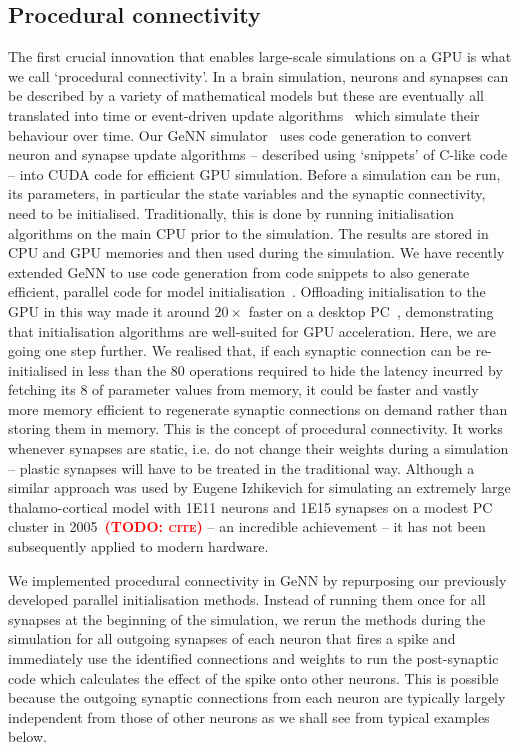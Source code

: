 \documentclass[9pt,twocolumn,twoside,lineno]{pnas-new}
\newcommand{\todo}[1]{\textbf{\textsc{\textcolor{red}{(TODO: #1)}}}}
\begin{document}
\subsection*{Procedural connectivity}
The first crucial innovation that enables large-scale simulations on a GPU is what we call `procedural connectivity'.
In a brain simulation, neurons and synapses can be described by a variety of mathematical models but these are eventually all translated into time or event-driven update algorithms~\citep{Brette2007} which simulate their behaviour over time.
Our GeNN simulator~\citep{Yavuz2016} uses code generation to convert neuron and synapse update algorithms -- described using `snippets' of C-like code -- into CUDA code for efficient GPU simulation.
Before a simulation can be run, its parameters, in particular the state variables and the synaptic connectivity, need to be initialised.
Traditionally, this is done by running initialisation algorithms on the main CPU prior to the simulation.
The results are stored in CPU and GPU memories and then used during the simulation.
We have recently extended GeNN to use code generation from code snippets to also generate efficient, parallel code for model initialisation~\citep{Knight2018}.
Offloading initialisation to the GPU in this way made it around $20\times$ faster on a desktop PC~\citep{Knight2018}, demonstrating that initialisation algorithms are well-suited for GPU acceleration.
Here, we are going one step further.
We realised that, if each synaptic connection can be re-initialised in less than the 80 operations required to hide the latency incurred by fetching its \SI{8}{\byte} of parameter values from memory, it could be faster and vastly more memory efficient to regenerate synaptic connections on demand rather than storing them in memory.
This is the concept of procedural connectivity. It works whenever synapses are static, i.e. do not change their weights during a simulation -- plastic synapses will have to be treated in the traditional way.
Although a similar approach was used by Eugene Izhikevich for simulating an extremely large thalamo-cortical model with \num{1E11} neurons and \num{1E15} synapses on a modest PC cluster in 2005~\todo{cite} -- an incredible achievement -- it has not been subsequently applied to modern hardware.

We implemented procedural connectivity in GeNN by repurposing our previously developed parallel initialisation methods.
Instead of running them once for all synapses at the beginning of the simulation, we rerun the methods during the simulation for all outgoing synapses of each neuron that fires a spike and immediately use the identified connections and weights to run the post-synaptic code which calculates the effect of the spike onto other neurons.
This is possible because the outgoing synaptic connections from each neuron are typically largely independent from those of other neurons as we shall see from typical examples below.
\end{document}
